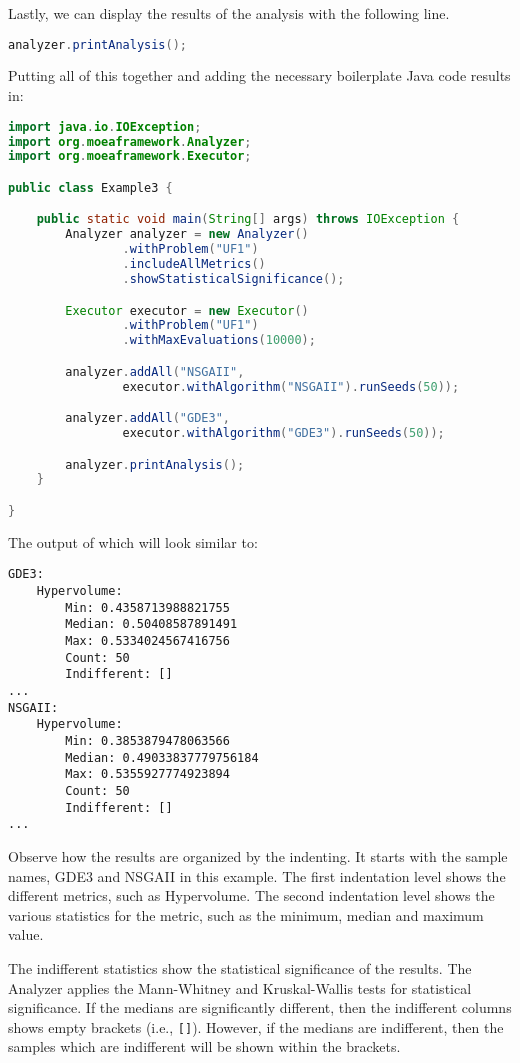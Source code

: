 Lastly, we can display the results of the analysis with the following line.

\begin{lstlisting}[language=Java]
analyzer.printAnalysis();
\end{lstlisting}

Putting all of this together and adding the necessary boilerplate Java code results in:

\begin{lstlisting}[language=Java]
import java.io.IOException;
import org.moeaframework.Analyzer;
import org.moeaframework.Executor;

public class Example3 {

	public static void main(String[] args) throws IOException {
		Analyzer analyzer = new Analyzer()
				.withProblem("UF1")
				.includeAllMetrics()
				.showStatisticalSignificance();

		Executor executor = new Executor()
				.withProblem("UF1")
				.withMaxEvaluations(10000);

		analyzer.addAll("NSGAII",  
				executor.withAlgorithm("NSGAII").runSeeds(50));

		analyzer.addAll("GDE3",
				executor.withAlgorithm("GDE3").runSeeds(50));

		analyzer.printAnalysis();
	}

}
\end{lstlisting}

The output of which will look similar to:

\begin{lstlisting}[language=Plaintext]
GDE3:
    Hypervolume:
        Min: 0.4358713988821755
        Median: 0.50408587891491
        Max: 0.5334024567416756
        Count: 50
        Indifferent: []
...
NSGAII:
    Hypervolume:
        Min: 0.3853879478063566
        Median: 0.49033837779756184
        Max: 0.5355927774923894
        Count: 50
        Indifferent: []
...
\end{lstlisting}

Observe how the results are organized by the indenting.  It starts with the sample names, GDE3 and NSGAII in this example.  The first indentation level shows the different metrics, such as Hypervolume.  The second indentation level shows the various statistics for the metric, such as the minimum, median and maximum value.

The indifferent statistics show the statistical significance of the results.  The Analyzer applies the Mann-Whitney and Kruskal-Wallis tests for statistical significance.  If the medians are significantly different, then the indifferent columns shows empty brackets (i.e., \texttt{[]}).  However, if the medians are indifferent, then the samples which are indifferent will be shown within the brackets.

